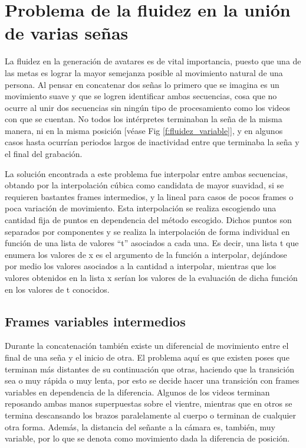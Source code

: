 \section{Problema de la fluidez en la unión de varias señas}\label{section:proposal:fluidez}
La fluidez en la generación de avatares es de vital importancia, puesto que una de las metas es lograr la mayor semejanza posible al movimiento natural de una persona. Al pensar en concatenar dos señas lo primero que se imagina es un movimiento suave y que se logren identificar ambas secuencias, cosa que no ocurre al unir dos secuencias sin ningún tipo de procesamiento como los videos con que se cuentan. No todos los intérpretes terminaban la seña de la misma manera, ni en la misma posición [véase Fig \ref{f:fluidez_variable}], y en algunos casos hasta ocurrían periodos largos de inactividad entre que terminaba la seña y el final del grabación. 


La solución encontrada a este problema fue interpolar entre ambas secuencias, obtando por la interpolación cúbica como candidata de mayor suavidad, si se requieren bastantes frames intermedios, y la lineal para casos de pocos frames o poca variación de movimiento.
Esta interpolación se realiza escogiendo una cantidad fija de puntos en dependencia del método escogido. Dichos puntos son separados por componentes y  se realiza la interpolación de forma individual en función de una lista de valores ``t'' asociados a cada una. Es decir, una lista t que enumera los valores de x es el argumento de la función a interpolar, dejándose por medio los valores asociados a la cantidad a interpolar, mientras que los valores obtenidos en la lista x serían los valores de la evaluación de dicha función en los valores de t conocidos.

\subsection{Frames variables intermedios}
Durante la concatenación también existe un diferencial de movimiento entre el final de una seña y el inicio de otra. El problema aquí es 
que existen poses que terminan más distantes de su continuación que otras, haciendo que 
la transición sea o muy rápida o muy lenta, por esto se decide hacer una transición con frames
variables en dependencia de la diferencia. Algunos de los videos terminan reposando ambas manos superpuestas sobre el vientre, mientras que en otros se termina descansando los brazos paralelamente al cuerpo o terminan de cualquier otra forma. Además, la distancia del señante a la cámara es, también, muy variable, por lo que se denota como movimiento dada la diferencia de posición.

